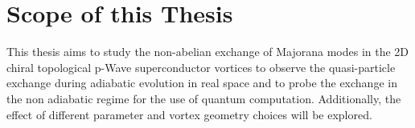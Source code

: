 \documentclass[Master]{subfiles}
\begin{document}
\section{Scope of this Thesis}
\vspace{0.3\textheight}
\begin{justify}
This thesis aims to study the non-abelian exchange of Majorana modes in the 2D chiral topological p-Wave superconductor vortices to observe the quasi-particle exchange during adiabatic evolution in real space and to probe the exchange in the non adiabatic regime for the use of quantum computation. Additionally, the effect of different parameter and vortex geometry choices will be explored.
\end{justify}
\vspace{\fill}
\end{document}
